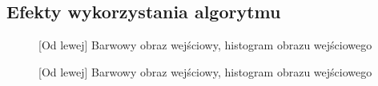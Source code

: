 \documentclass[a4paper,12pt, titlepage]{report}
\begin{document}
\subsection*{Efekty wykorzystania algorytmu}
\begin{figure}[h]
    \centering
    \caption{[Od lewej] Barwowy obraz wejściowy, histogram obrazu wejściowego}%
    \label{fig:geo_after_grey1}%
\end{figure}
\FloatBarrier
\begin{figure}[h]
    \centering
    \caption{[Od lewej] Barwowy obraz wejściowy, histogram obrazu wejściowego}%
    \label{fig:geo_after_grey1}%
\end{figure}
\FloatBarrier
\end{document}
